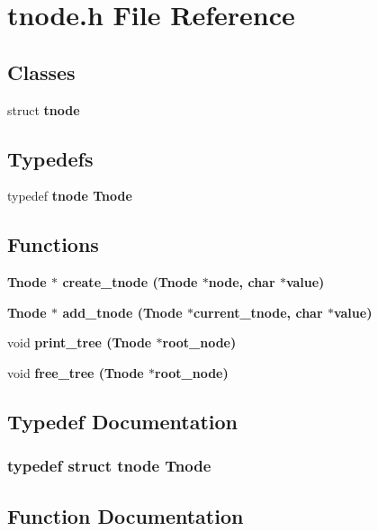 \section{tnode.h File Reference}
\label{tnode_8h}
\subsection*{Classes}
\begin{CompactItemize}
\item 
struct \bf{tnode}
\end{CompactItemize}
\subsection*{Typedefs}
\begin{CompactItemize}
\item 
typedef \bf{tnode} \bf{Tnode}
\end{CompactItemize}
\subsection*{Functions}
\begin{CompactItemize}
\item 
\bf{Tnode} $\ast$ \bf{create\_\-tnode} (\bf{Tnode} $\ast$node, char $\ast$value)
\item 
\bf{Tnode} $\ast$ \bf{add\_\-tnode} (\bf{Tnode} $\ast$current\_\-tnode, char $\ast$value)
\item 
void \bf{print\_\-tree} (\bf{Tnode} $\ast$root\_\-node)
\item 
void \bf{free\_\-tree} (\bf{Tnode} $\ast$root\_\-node)
\end{CompactItemize}


\subsection{Typedef Documentation}
\subsubsection{\setlength{\rightskip}{0pt plus 5cm}typedef struct \bf{tnode} \bf{Tnode}}\label{tnode_8h_dc5205d32231d48b8f1b91e14575adcb}




\subsection{Function Documentation}
